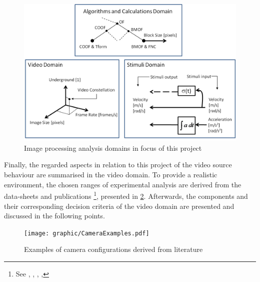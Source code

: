 \begin{figure}[H]
	\centering
		\includegraphics[width=1\textwidth]{graphic/ImageProcessingAnalysisDomains.png}
	\caption{Image processing analysis domains in focus of this project}
	\label{fig:ImageProcessingAnalysisDomains.png}
\end{figure}

Finally, the regarded aspects in relation to this project of the video source behaviour are summarised in the video domain. To provide a realistic environment, the chosen ranges of experimental analysis are derived from the data-sheets and publications 
\footnote{See , ,
, , }, presented in \ref{fig:CameraExamples.pdf}. Afterwards, the components and their corresponding decision criteria of the video domain are presented and discussed in the following points.



\begin{figure}[H]
	\centering
		\texttt{[image: graphic/CameraExamples.pdf]}
	\caption{Examples of camera configurations derived from literature}
	\label{fig:CameraExamples.pdf}
\end{figure}


